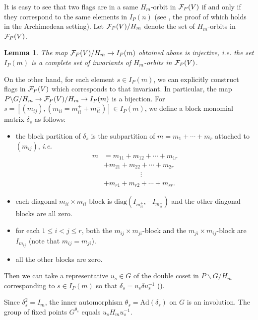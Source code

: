 \documentclass[11pt,letterpaper]{amsart}
\newcommand{\Ad}{\mathrm{Ad}}
\def\diag{\mathrm{diag}}
\theoremstyle{plain}
\newtheorem{lem}[thm]{Lemma}  \newtheorem{prop}[thm]{Proposition}
\numberwithin{equation}{section}
\begin{document}
It is easy to see that two flags are in a same $H_m$-orbit in ${\mathcal {F}}_P(V)$ if and only if they correspond to the same elements in $I_P(n)$ (see \cite[Proposition 3.1]{MatCRELLE}, the proof of which holds in the Archimedean setting).
Let ${\mathcal {F}}_P(V)/H_m$ denote the set of $H_m$-orbits in ${\mathcal {F}}_P(V)$.

\begin{lem}
The map ${\mathcal {F}}_P(V)/H_m \to I_P(m)$ obtained above is injective,  \emph{i.e.} the set $I_P(m)$ is a complete set of invariants of $H_m$-orbits in ${\mathcal {F}}_P(V)$.
\end{lem}

On the other hand,  for each element $s\in I_P(m)$,  we can explicitly construct flags in ${\mathcal {F}}_P(V)$ which corresponds to that invariant.
In particular,  the map $P\backslash G/H_m \to  {\mathcal {F}}_P(V)/H_m \to I_P(m)$ is a bijection.
For $s=[(m_{ij}),  (m_{ii}=m_{ii}^+ + m_{ii}^-)]\in I_P(m)$,  we define a block monomial matrix $\delta_s$ as follows:
\begin{itemize}
\item[(i)] the block partition of $\delta_s$ is the subpartition of $m=m_1+\cdots+m_r$ attached to $(m_{ij})$,  \emph{i.e.} 
    \begin{align}\label{eq:partition}
    m & = m_{11} + m_{12} + \cdots+m_{1r} \\ \nonumber 
     &  + m_{21} + m_{22} + \cdots + m_{2r}  \\ \nonumber 
     & \phantom{+ m_{21} + m_{22}}  \vdots  \\ \nonumber 
     & + m_{r1} + m_{r2} + \cdots + m_{rr}. 
    \end{align}
\item[(ii)] each diagonal $m_{ii}\times m_{ii}$-block is $\diag(I_{m_{ii}^+},  -I_{m_{ii}^-})$ and the other diagonal blocks are all zero.
\item[(iii)] for each $1\leq i< j \leq r$,  both the $m_{ij}\times m_{ji}$-block and the $m_{ji}\times m_{ij}$-block are $I_{m_
{ij}}$ (note that $m_{ij}=m_{ji}$).
\item[(iv)] all the other blocks are zero.
\end{itemize}
Then we can take a representative $u_s\in G$ of the double coset in $P\backslash G/H_m$ corresponding to $s\in I_P(m)$ so that $\delta_s=u_s\delta u_s^{-1}$ (\cite[Proposition 3.2]{MatCRELLE}).

Since $\delta_s^2=I_m$,  the inner automorphism $\theta_s=\Ad(\delta_s)$ on $G$ is an involution.
The group of fixed points $G^{\theta_s}$ equals $u_sH_m u_s^{-1}$.
\end{document}
